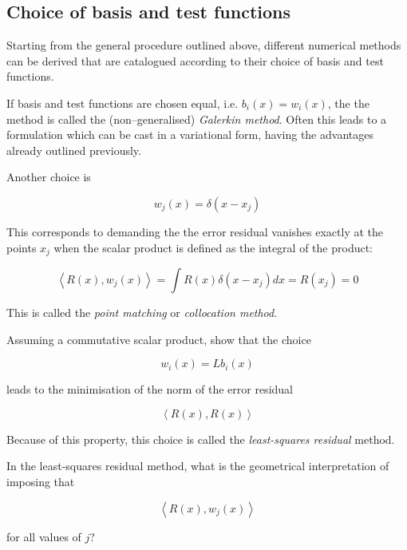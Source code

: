 \subsection{Choice of basis and test functions}

Starting from the general procedure outlined above, different numerical methods can be derived that are catalogued according to their choice of basis and test functions.

If basis and test functions are chosen equal, i.e. $b_i(x) = w_i(x)$, the the method is called the (non--generalised) \emph{Galerkin method}. Often this leads to a formulation which can be cast in a variational form, having the advantages already outlined previously.

Another choice is

\begin{equation}
w_j(x) = \delta(x-x_j)
\end{equation} 

This corresponds to demanding the the error residual vanishes exactly at the points $x_j$ when the scalar product is defined as the integral of the product:

\begin{equation}
\left\langle R(x), w_j(x) \right\rangle = \int R(x) \delta(x-x_j) dx = R(x_j) = 0
\end{equation} 

This is called the \emph{point matching} or \emph{collocation method}.


\begin{exer}
Assuming a commutative scalar product, show that the choice 

$$w_i(x) = L b_i(x)$$

leads to the minimisation of the norm of the error residual 

$$\left\langle R(x), R(x) \right\rangle$$ 

Because of this property, this choice is called the \emph{least-squares residual} method.
\end{exer}



\begin{exer}
In the least-squares residual method, what is the geometrical interpretation of imposing that 

$$\left\langle R(x), w_j(x) \right\rangle$$ 

for all values of $j$?
\end{exer}



